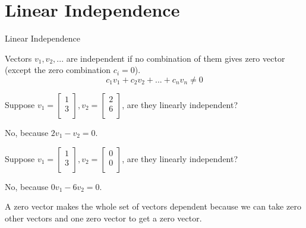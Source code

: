 \documentclass{beamer}
\begin{document}
\section{Linear Independence}
\begin{frame}{Linear Independence}
\begin{definition}
Vectors $v_1, v_2, ...$ are independent if no combination of them gives zero vector (except the zero combination $c_i=0$).
\vspace{-8pt}
\begin{equation*}
    c_1v_1+c_2v_2+...+c_nv_n\ne0
\end{equation*}
\end{definition}

Suppose $v_1=\left[ \begin{array}{c}
	1\\
	3\\
\end{array} \right], v_2=\left[ \begin{array}{c}
	2\\
	6\\
\end{array} \right]$, are they linearly independent?

No, because $2v_1-v_2=0$.

\vspace{5pt}
Suppose $v_1=\left[ \begin{array}{c}
	1\\
	3\\
\end{array} \right], v_2=\left[ \begin{array}{c}
	0\\
	0\\
\end{array} \right]$, are they linearly independent?

No, because $0v_1-6v_2=0$.

\vspace{3pt} A zero vector makes the whole set of vectors dependent because we can take zero other vectors and one zero vector to get a zero vector.
\end{frame}
\end{document}
